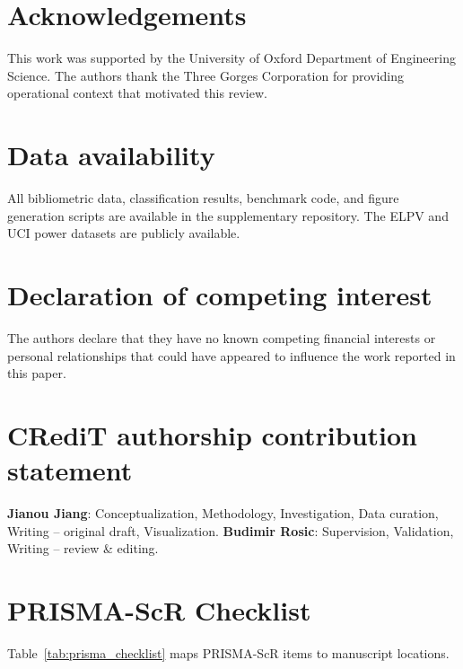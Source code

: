 \documentclass[preprint,12pt]{elsarticle}
\begin{document}
\section*{Acknowledgements}
This work was supported by the University of Oxford Department of Engineering Science. The authors thank the Three Gorges Corporation for providing operational context that motivated this review.

\section*{Data availability}
All bibliometric data, classification results, benchmark code, and figure generation scripts are available in the supplementary repository. The ELPV and UCI power datasets are publicly available.

\section*{Declaration of competing interest}
The authors declare that they have no known competing financial interests or personal relationships that could have appeared to influence the work reported in this paper.

\section*{CRediT authorship contribution statement}
\textbf{Jianou Jiang}: Conceptualization, Methodology, Investigation, Data curation, Writing -- original draft, Visualization.
\textbf{Budimir Rosic}: Supervision, Validation, Writing -- review \& editing.

\appendix
\section{PRISMA-ScR Checklist}
\label{app:prisma_checklist}

Table~\ref{tab:prisma_checklist} maps PRISMA-ScR items \cite{tricco2018prisma_scr} to manuscript locations.
\end{document}

